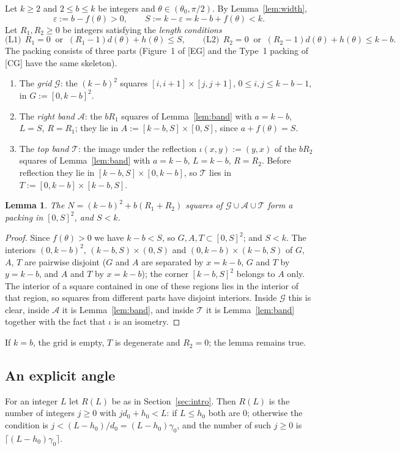 \documentclass[11pt]{amsart}
\newcommand{\cG}{\mathcal G}
\newcommand{\cA}{\mathcal A}
\newcommand{\cT}{\mathcal T}
\newtheorem{lemma}[theorem]{Lemma}
\theoremstyle{definition}
\theoremstyle{remark}
\numberwithin{equation}{section}
\begin{document}
Let $k\ge2$ and $2\le b\le k$ be integers and $\theta\in(\theta_0,\pi/2)$. By Lemma~\ref{lem:width},
\[
\varepsilon:=b-f(\theta)>0,\qquad S:=k-\varepsilon=k-b+f(\theta)<k .
\]
Let $R_1,R_2\ge0$ be integers satisfying the \emph{length conditions}
\[
\text{(L1)}\ \ R_1=0\ \text{ or }\ (R_1-1)d(\theta)+h(\theta)\le S,\qquad
\text{(L2)}\ \ R_2=0\ \text{ or }\ (R_2-1)d(\theta)+h(\theta)\le k-b .
\]
The packing consists of three parts (Figure~1 of [EG] and the Type~1 packing of [CG] have the same skeleton).
\begin{enumerate}[label=(\arabic*)]
\item The \emph{grid} $\cG$: the $(k-b)^2$ squares $[i,i+1]\times[j,j+1]$, $0\le i,j\le k-b-1$, in $G:=[0,k-b]^2$.
\item The \emph{right band} $\cA$: the $bR_1$ squares of Lemma~\ref{lem:band} with $a=k-b$, $L=S$, $R=R_1$; they lie in
$A:=[k-b,S]\times[0,S]$, since $a+f(\theta)=S$.
\item The \emph{top band} $\cT$: the image under the reflection $\iota(x,y):=(y,x)$ of the $bR_2$ squares of
Lemma~\ref{lem:band} with $a=k-b$, $L=k-b$, $R=R_2$. Before reflection they lie in $[k-b,S]\times[0,k-b]$, so $\cT$ lies
in $T:=[0,k-b]\times[k-b,S]$.
\end{enumerate}

\begin{lemma}\label{lem:valid}
The $N=(k-b)^2+b(R_1+R_2)$ squares of $\cG\cup\cA\cup\cT$ form a packing in $[0,S]^2$, and $S<k$.
\end{lemma}

\begin{proof}
Since $f(\theta)>0$ we have $k-b<S$, so $G,A,T\subset[0,S]^2$; and $S<k$. The interiors $(0,k-b)^2$,
$(k-b,S)\times(0,S)$ and $(0,k-b)\times(k-b,S)$ of $G$, $A$, $T$ are pairwise disjoint ($G$ and $A$ are separated by
$x=k-b$, $G$ and $T$ by $y=k-b$, and $A$ and $T$ by $x=k-b$); the corner $[k-b,S]^2$ belongs to $A$ only. The interior of
a square contained in one of these regions lies in the interior of that region, so squares from different parts have
disjoint interiors. Inside $\cG$ this is clear, inside $\cA$ it is Lemma~\ref{lem:band}, and inside $\cT$ it is
Lemma~\ref{lem:band} together with the fact that $\iota$ is an isometry.
\end{proof}

If $k=b$, the grid is empty, $T$ is degenerate and $R_2=0$; the lemma remains true.

\subsection{An explicit angle}
For an integer $L$ let $R(L)$ be as in Section~\ref{sec:intro}. Then $R(L)$ is the number of integers $j\ge0$ with
$jd_0+h_0<L$: if $L\le h_0$ both are $0$; otherwise the condition is $j<(L-h_0)/d_0=(L-h_0)\gamma_0$, and the number of
such $j\ge0$ is $\lceil(L-h_0)\gamma_0\rceil$.
\end{document}
